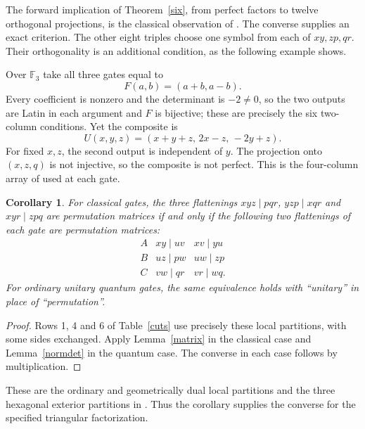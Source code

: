 \documentclass[11pt]{article}
\newtheorem{corollary}[theorem]{Corollary}
\begin{document}
The forward implication of Theorem~\ref{six}, from perfect factors to
twelve orthogonal projections, is the classical observation of
\cite[\S4, following (4.2)]{PW}. The converse supplies an exact criterion.
The other eight triples choose one symbol from each of $xy,zp,qr$.
Their orthogonality is an additional condition, as the following example
shows.

Over $\mathbb F_3$ take all three gates equal to
\[
 F(a,b)=(a+b,a-b).
\]
Every coefficient is nonzero and the determinant is $-2\ne0$, so the
two outputs are Latin in each argument and $F$ is bijective; these are
precisely the six two-column conditions. Yet the composite is
\[
 U(x,y,z)=(x+y+z,\,2x-z,\,-2y+z).
\]
For fixed $x,z$, the second output is independent of $y$. The projection
onto $(x,z,q)$ is not injective, so the composite is not perfect. This is
the four-column array of \cite[Table 1]{PW} used at each gate.

\begin{corollary}\label{dual}
For classical gates, the three flattenings
$xyz\mid pqr$, $yzp\mid xqr$ and $xyr\mid zpq$ are permutation
matrices if and only if the following two flattenings of each gate are
permutation matrices:
\[
\begin{array}{c|cc}
A&xy\mid uv&xv\mid yu\\
B&uz\mid pw&uw\mid zp\\
C&vw\mid qr&vr\mid wq.
\end{array}
\]
For ordinary unitary quantum gates, the same equivalence holds with
``unitary'' in place of ``permutation''.
\end{corollary}
\begin{proof}
Rows 1, 4 and 6 of Table~\ref{cuts} use precisely these local
partitions, with some sides exchanged. Apply Lemma~\ref{matrix} in the
classical case and Lemma~\ref{normdet} in the quantum case. The converse
in each case follows by multiplication.
\end{proof}
These are the ordinary and geometrically dual local partitions and the
three hexagonal exterior partitions in \cite[\S3.2, Theorem 1]{PW}.
Thus the corollary supplies the converse for the specified triangular
factorization.
\end{document}
